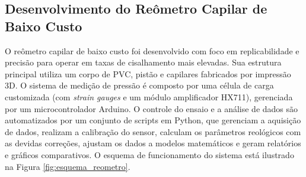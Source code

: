 \documentclass[article,12pt,oneside,a4paper,english,brazil,sumario=tradicional]{abntex2}
\begin{document}
 

\subsection{Desenvolvimento do Reômetro Capilar de Baixo Custo}
\label{subsubsec:reometro-capilar}
O reômetro capilar de baixo custo foi desenvolvido com foco em replicabilidade e precisão para operar em taxas de cisalhamento mais elevadas. Sua estrutura principal utiliza um corpo de PVC, pistão e capilares fabricados por impressão 3D. O sistema de medição de pressão é composto por uma célula de carga customizada (com \textit{strain gauges} e um módulo amplificador HX711), gerenciada por um microcontrolador Arduino. O controle do ensaio e a análise de dados são automatizados por um conjunto de scripts em Python, que gerenciam a aquisição de dados, realizam a calibração do sensor, calculam os parâmetros reológicos com as devidas correções, ajustam os dados a modelos matemáticos e geram relatórios e gráficos comparativos. O esquema de funcionamento do sistema está ilustrado na Figura \ref{fig:esquema_reometro}.
\end{document}
